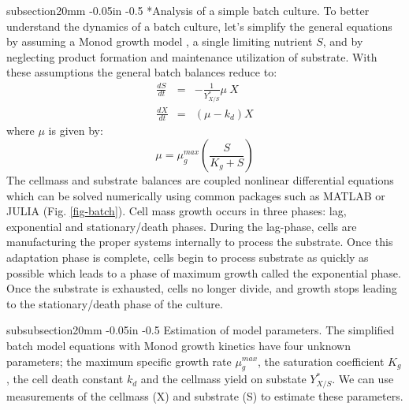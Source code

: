 \documentclass[11pt]{article}
\makeatletter
\theoremstyle{definition}
\renewcommand\subsection{\@startsection
	{subsection}{2}{0mm}
	{-0.05in}
	{-0.5\baselineskip}
	{\normalfont\normalsize\bfseries}}
\renewcommand\subsubsection{\@startsection
	{subsubsection}{2}{0mm}
	{-0.05in}
	{-0.5\baselineskip}
	{\normalfont\normalsize\itshape}}
\makeatother
\begin{document}
\subsection*{Analysis of a simple batch culture.}
To better understand the dynamics of a batch culture, let's simplify the general equations by assuming a Monod growth model \citep{Legout:2010aa}, a single limiting nutrient $S$, and by neglecting product formation and maintenance utilization of substrate.
With these assumptions the general batch balances reduce to:
\begin{eqnarray}\label{eqn-metabolite-batch-simple}
	\frac{dS}{dt} &=& -\frac{1}{Y_{X/S}^{*}}\mu~X\\
	\frac{dX}{dt} &=& \left(\mu - k_{d}\right)X
\end{eqnarray}
where $\mu$ is given by:
\begin{equation}\label{eqn-monod-growth-model}
	\mu = \mu_{g}^{max}\left(\frac{S}{K_{g} + S}\right)
\end{equation}
The cellmass and substrate balances are coupled nonlinear differential equations which can be solved numerically using common packages such as MATLAB or JULIA \citep{BEKS14} (Fig. \ref{fig-batch}).
Cell mass growth occurs in three phases: lag, exponential and stationary/death phases. During the lag-phase, cells are manufacturing the proper systems internally to process the substrate.
Once this adaptation phase is complete, cells begin to process substrate as quickly as possible which leads to a phase of maximum growth called the exponential phase.
Once the substrate is exhausted, cells no longer divide, and growth stops leading to the stationary/death phase of the culture.

\begin{figure*}[!h]\centering
{}
\caption{Theoretical growth and substrate curve for cells in a well-mixed batch culture as a function of time.
The x-axis denotes time [hr] while the y-axis denotes the cellmass (X) [gdw/L] or substrate (S) [mmol/L] concentration.}\label{fig-batch}
\end{figure*}

\subsubsection{Estimation of model parameters.}
The simplified batch model equations with Monod growth kinetics have four unknown parameters; the maximum specific growth rate $\mu_{g}^{max}$, the saturation coefficient $K_{g}$, the cell death constant $k_{d}$ and the cellmass yield on substate
$Y_{X/S}^{*}$. We can use measurements of the cellmass (X) and substrate (S) to estimate these parameters.
\end{document}
